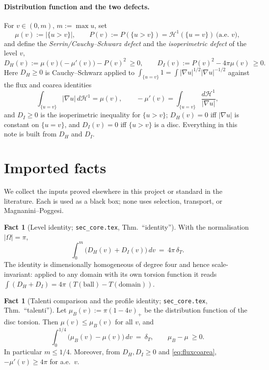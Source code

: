 \documentclass[11pt]{article}
\theoremstyle{definition}
\newtheorem{fact}[theorem]{Fact}
\newcommand{\Om}{\Omega}
\newcommand{\HH}{\mathcal H}
\newcommand{\dT}{\delta_T}
\newcommand{\abs}[1]{\left|#1\right|}
\begin{document}
\paragraph{Distribution function and the two defects.}
For $v\in(0,m)$, $m:=\max u$, set
\[
   \mu(v):=\abs{\{u>v\}},\qquad P(v):=P(\{u>v\})=\HH^1(\{u=v\})\ \text{(a.e. }v),
\]
and define the \emph{Serrin/Cauchy--Schwarz defect} and the
\emph{isoperimetric defect} of the level $v$,
\begin{equation}\label{eq:DHDI}
   D_H(v):=\mu(v)\bigl(-\mu'(v)\bigr)-P(v)^2\ \ge0,
   \qquad
   D_I(v):=P(v)^2-4\pi\mu(v)\ \ge0 .
\end{equation}
Here $D_H\ge0$ is Cauchy--Schwarz applied to
$\int_{\{u=v\}}\!1=\int|\nabla u|^{1/2}|\nabla u|^{-1/2}$ against the flux
and coarea identities
\begin{equation}\label{eq:fluxcoarea}
   \int_{\{u=v\}}\!\abs{\nabla u}\,d\HH^1=\mu(v),
   \qquad
   -\mu'(v)=\int_{\{u=v\}}\!\frac{d\HH^1}{\abs{\nabla u}},
\end{equation}
and $D_I\ge0$ is the isoperimetric inequality for $\{u>v\}$; $D_H(v)=0$ iff
$\abs{\nabla u}$ is constant on $\{u=v\}$, and $D_I(v)=0$ iff $\{u>v\}$ is a
disc. Everything in this note is built from $D_H$ and $D_I$.

\section{Imported facts}
\label{sec:imports}

We collect the inputs proved elsewhere in this project or standard in the
literature. Each is used as a black box; none uses selection, transport, or
Magnanini--Poggesi.

\begin{fact}[Level identity; \texttt{sec\_core.tex}, Thm.~``identity'']
\label{fact:identity}
With the normalisation $\abs\Om=\pi$,
\begin{equation}\label{eq:identity}
   \int_0^m\bigl(D_H(v)+D_I(v)\bigr)\,dv\ =\ 4\pi\,\dT .
\end{equation}
The identity is dimensionally homogeneous of degree four and hence
scale-invariant: applied to any domain with its own torsion function it
reads $\int(D_H+D_I)=4\pi\,(T(\text{ball})-T(\text{domain}))$.
\end{fact}

\begin{fact}[Talenti comparison and the profile identity;
\texttt{sec\_core.tex}, Thm.~``talenti'']\label{fact:talenti}
Let $\mu_B(v):=\pi(1-4v)_+$ be the distribution function of the disc
torsion. Then $\mu(v)\le\mu_B(v)$ for all $v$, and
\begin{equation}\label{eq:profile}
   \int_0^{1/4}\bigl(\mu_B(v)-\mu(v)\bigr)\,dv\ =\ \dT,
   \qquad \mu_B-\mu\ \ge0 .
\end{equation}
In particular $m\le1/4$. Moreover, from $D_H,D_I\ge0$ and
\eqref{eq:fluxcoarea}, $-\mu'(v)\ge4\pi$ for a.e.\ $v$.
\end{fact}
\end{document}
